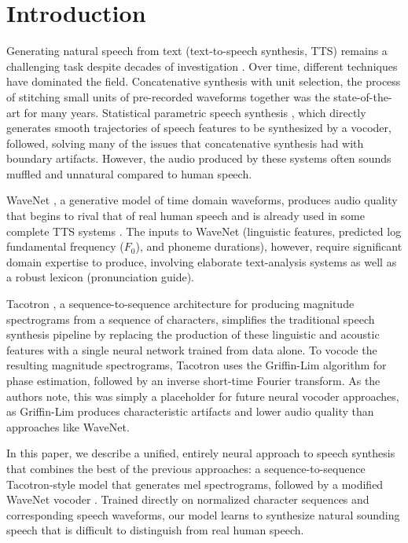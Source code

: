\section{Introduction}
\label{sec:intro}

Generating natural speech from text (text-to-speech synthesis, TTS) remains a
challenging task despite decades of investigation \cite{Taylor:2009:TS:1592988}.
%
Over time, different techniques have dominated the field.
%
Concatenative synthesis with unit selection, the process of stitching small
units of pre-recorded waveforms together
\cite{Hunt:1996:USC:1256383.1256532,cstr:unitsel97} was the state-of-the-art for
many years.
%
Statistical parametric speech synthesis
\cite{Tokuda00speechparameter,Black07statisticalparametric,40837,tokuda2013speech},
which directly generates smooth trajectories of speech features to be
synthesized by a vocoder, followed, solving many of the issues that
concatenative synthesis had with boundary artifacts. However, the audio produced
by these systems often sounds muffled and unnatural compared to human speech.

WaveNet \cite{45774}, a generative model of time domain
waveforms, produces audio quality that begins to rival that of real human
speech and is already used in some complete TTS systems
\cite{DBLP:journals/corr/ArikCCDGKLMRSS17,DBLP:journals/corr/ArikDGMPPRZ17,2017arXiv171007654P}.
%
The inputs to WaveNet (linguistic features, predicted log fundamental
frequency ($F_0$), and phoneme durations), however, require significant domain
expertise to produce, involving elaborate text-analysis systems as well as a
robust lexicon (pronunciation guide).

Tacotron \cite{46150}, a sequence-to-sequence architecture
\cite{conf/nips/SutskeverVL14} for producing magnitude spectrograms from
a sequence of characters, simplifies the traditional speech synthesis pipeline
by replacing the production of these linguistic and acoustic features with a
single neural network trained from data alone. To vocode the resulting magnitude
spectrograms, Tacotron uses the Griffin-Lim algorithm
\cite{Griffin84signalestimation} for phase estimation, followed by an inverse
short-time Fourier transform. As the authors note, this was simply a placeholder
for future neural vocoder approaches, as Griffin-Lim produces characteristic
artifacts and lower audio quality than approaches like WaveNet.

In this paper, we describe a unified, entirely neural approach to speech
synthesis that combines the best of the previous approaches: a
sequence-to-sequence Tacotron-style model \cite{46150} that generates mel
spectrograms, followed by a modified WaveNet vocoder
\cite{DBLP:journals/corr/ArikDGMPPRZ17,tamamori2017speaker}. Trained directly
on normalized character sequences and corresponding speech waveforms, our
model learns to synthesize natural sounding speech that is difficult to
distinguish from real human speech.

